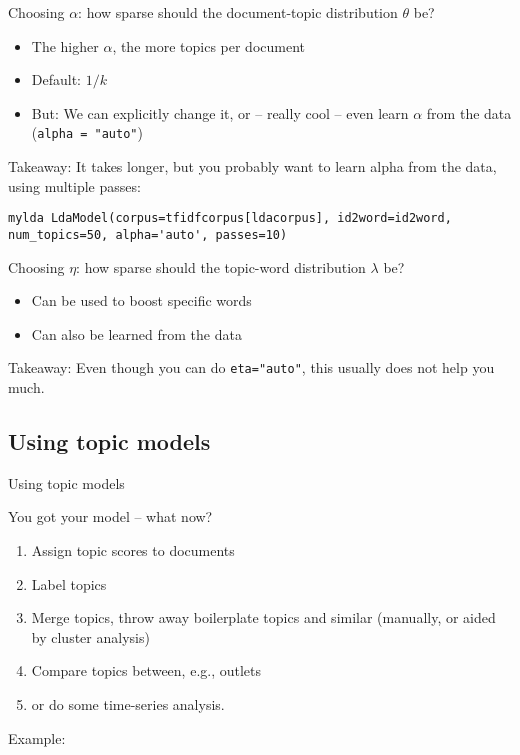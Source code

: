 \begin{frame}[fragile]{Choosing $\alpha$: how sparse should the document-topic distribution $\theta$ be?}
\begin{itemize}
	\item The higher $\alpha$, the more topics per document 
	\item Default: $1/k$
	\item But: We can explicitly change it, or -- really cool -- even learn $\alpha$ from the data (\texttt{alpha = "auto"})
\end{itemize}

\pause 

Takeaway: It takes longer, but you probably want to learn alpha from the data, using multiple passes:

\begin{lstlisting}
mylda LdaModel(corpus=tfidfcorpus[ldacorpus], id2word=id2word, num_topics=50, alpha='auto', passes=10)
\end{lstlisting}


\end{frame}


\begin{frame}{Choosing $\eta$: how sparse should the topic-word distribution $\lambda$ be?}
  \begin{itemize}
  \item Can be used to boost specific words
  \item Can also be learned from the data 
  \end{itemize}

\pause
Takeaway: Even though you can do \texttt{eta="auto"}, this usually does not help you much.

\end{frame}




\subsection{Using topic models}

\begin{frame}{Using topic models}

You got your model -- what now?

\begin{enumerate}
\item Assign topic scores to documents
\item Label topics
\item Merge topics, throw away boilerplate topics and similar (manually, or aided by cluster analysis)
\item Compare topics between, e.g., outlets
\item or do some time-series analysis.
\end{enumerate}


Example: \cite{Tsur2015}

\end{frame}



